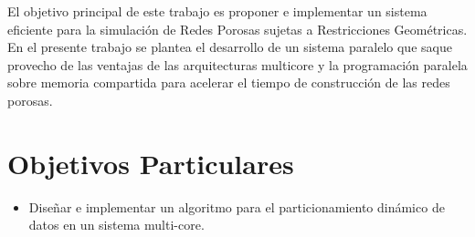 El objetivo principal de  este trabajo es proponer e implementar un sistema eficiente para la simulaci\'on de Redes Porosas sujetas a Restricciones Geométricas.  En el presente trabajo se plantea el desarrollo de un sistema paralelo que saque provecho de las ventajas de las arquitecturas multicore y la programación paralela sobre memoria compartida para acelerar el tiempo de construcci\'on de las redes porosas.

\section{Objetivos Particulares}
\label{sec:objetivosp}
\begin{itemize}


\item {Diseñar e implementar un algoritmo para el particionamiento din\'amico de datos en un sistema multi-core}.


\end{itemize}
